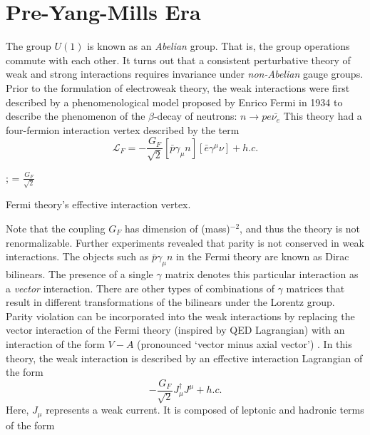 \section{Pre-Yang-Mills Era}\label{sec:pre_yang_mills}

The group $U(1)$ is known as an \emph{Abelian} group. That is, the group operations commute with each other. It turns out that a consistent perturbative theory of weak and strong interactions requires invariance under \emph{non-Abelian} gauge groups. Prior to the formulation of electroweak theory, the weak interactions were first described by a phenomenological model proposed by Enrico Fermi in 1934 \citep{Fermi:1934sk,Fermi:1934hr} to describe the phenomenon of the $\beta$-decay of neutrons: $n\rightarrow p e \bar{\nu_e}$ This theory had a four-fermion interaction vertex described by the term
\begin{equation}
\mathcal{L}_F = -\frac{G_F}{\sqrt{2}}\left[\bar{p}\gamma_\mu n\right]\left[\bar{e}\gamma^\mu\nu\right] + h.c.
\end{equation}
\begin{marginfigure}[-1cm]
;
= $\frac{G_F}{\sqrt{2}}$
\caption{Fermi theory's effective interaction vertex.}
\end{marginfigure}
Note that the coupling $G_F$ has dimension of (mass)$^{-2}$, and thus the theory is not renormalizable. Further experiments \citep{Wu:1957my} revealed that parity is not conserved in weak interactions. The objects such as $\bar{p}\gamma_\mu n$ in the Fermi theory are known as Dirac bilinears. The presence of a single $\gamma$ matrix denotes this particular interaction as a \emph{vector} interaction. There are other types of combinations of $\gamma$ matrices that result in different transformations of the bilinears under the Lorentz group. Parity violation can be incorporated into the weak interactions by replacing the vector interaction of the Fermi theory (inspired by QED Lagrangian)  with an interaction of the form $V-A$ (pronounced `vector minus axial vector') \citep{Lesov2009}. In this theory, the weak interaction is described by an effective interaction Lagrangian of the form
\begin{equation}
-\frac{G_F}{\sqrt{2}}J^\dagger_\mu J^\mu + h.c.
\end{equation}
Here, $J_\mu$ represents a weak current. It is composed of leptonic and hadronic terms of the form 
